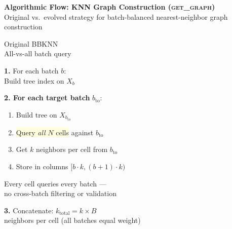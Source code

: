 \documentclass[8pt]{article}
\newlength{\colw}
\begin{document}
\setlength{\colw}{0.48\textwidth}

\begin{center}
{\large\bfseries Algorithmic Flow: KNN Graph Construction (\textsc{get\_graph})}\\[1pt]
{\scriptsize Original vs.\ evolved strategy for batch-balanced nearest-neighbor graph construction}
\end{center}
\vspace{2pt}

\noindent
\begin{minipage}[t]{\colw}
\begin{tcolorbox}[colback=hdrA, colframe=hdrA, fontupper=\bfseries\footnotesize\color{white},
    arc=2pt, left=2pt, right=2pt, top=1pt, bottom=1pt]
\centering Original BBKNN\\[-2pt]
{\scriptsize\mdseries All-vs-all batch query}
\end{tcolorbox}
\vspace{1pt}

\begin{stepbox}
\textbf{1.} For each batch $b$:\\
Build tree index on $X_b$
\end{stepbox}\vspace{1pt}

\begin{warnbox}
\textbf{2. For each target batch} $b_\text{to}$:
\begin{enumerate}[leftmargin=1em, itemsep=0pt, topsep=1pt, parsep=0pt]
\item Build tree on $X_{b_\text{to}}$
\item \colorbox{lightyellow}{Query \emph{all} $N$ cells} against $b_\text{to}$
\item Get $k$ neighbors per cell from $b_\text{to}$
\item Store in columns $[b \cdot k, (b{+}1) \cdot k)$
\end{enumerate}
{\scriptsize\color{removed} Every cell queries every batch ---\\
no cross-batch filtering or validation}
\end{warnbox}\vspace{1pt}

\begin{stepbox}
\textbf{3.} Concatenate: $k_\text{total} = k \times B$\\
neighbors per cell (all batches equal weight)
\end{stepbox}\vspace{1pt}


\end{minipage}
\end{document}
